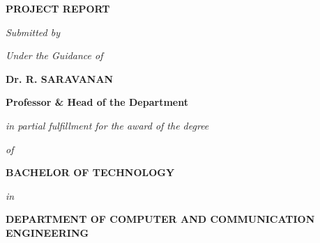 \documentclass[12pt,a4paper]{report}
\begin{document}
\hypersetup{pageanchor=false}

\begin{titlepage}
\thispagestyle{empty}
\begin{singlespace}
\begin{center}
    \vspace*{0.4cm}
    {\fontsize{16pt}{20pt}\selectfont\textbf{PROJECT REPORT}\par}
    \vspace{1.0cm}
    
    {\fontsize{12pt}{15pt}\selectfont\textit{Submitted by}\par}
    \vspace{0.45cm}
    
    \noindent{}\par
    
    \vspace{1.0cm}
    {\fontsize{12pt}{15pt}\selectfont\textit{Under the Guidance of}\par}
    \vspace{0.35cm}
    {\fontsize{14pt}{17pt}\selectfont\textbf{Dr. R. SARAVANAN}\par}
    \vspace{0.15cm}
    {\fontsize{12pt}{15pt}\selectfont\textbf{Professor \& Head of the Department}\par}
    
    \vspace{1.0cm}
    {\fontsize{12pt}{15pt}\selectfont\textit{in partial fulfillment for the award of the degree}\par}
    \vspace{0.2cm}
    {\fontsize{12pt}{15pt}\selectfont\textit{of}\par}
    \vspace{0.35cm}
    {\fontsize{14.5pt}{18pt}\selectfont\textbf{BACHELOR OF TECHNOLOGY}\par}
    \vspace{0.2cm}
    {\fontsize{12pt}{15pt}\selectfont\textit{in}\par}
    \vspace{0.35cm}
    {\fontsize{13pt}{16pt}\selectfont\textbf{DEPARTMENT OF COMPUTER AND COMMUNICATION ENGINEERING}\par}
    

\end{center}
\end{singlespace}
\end{titlepage}
\end{document}
